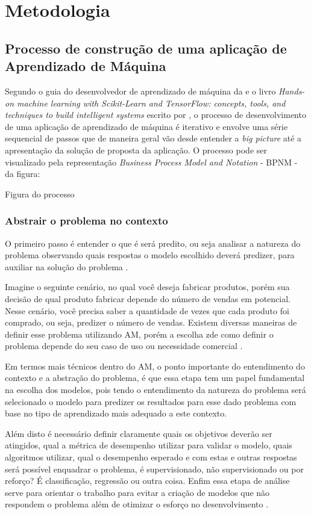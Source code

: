 \chapter{Metodologia}
\section{Processo de construção de uma aplicação de Aprendizado de Máquina}

Segundo o guia do desenvolvedor de aprendizado de máquina da \cite{Amazon} e o livro \textit{Hands-on machine learning with Scikit-Learn and TensorFlow: concepts, tools, and techniques to build intelligent systems} escrito por \cite{geron2017hands}, o processo de desenvolvimento de uma aplicação de aprendizado de máquina é iterativo e envolve uma série sequencial de passos que de maneira geral vão desde entender a \textit{big picture} até a apresentação da solução de proposta da aplicação. O processo pode ser visualizado pela representação \textit{Business Process Model and Notation} - BPNM - da figura:

Figura do processo 

\subsection{Abstrair o problema no contexto}
O primeiro passo é entender o que é será predito, ou seja analisar a natureza do problema observando quais respostas o modelo escolhido deverá predizer, para auxiliar na solução do problema \cite{geron2017hands}.

Imagine o seguinte cenário, no qual você deseja fabricar produtos, porém sua decisão de qual produto fabricar depende do número de vendas em potencial. Nesse cenário, você precisa saber a quantidade de vezes que cada produto foi comprado, ou seja, predizer o número de vendas. Existem diversas maneiras de definir esse problema utilizando AM, porém a escolha  zde como definir o problema depende do seu caso de uso ou necessidade comercial \cite{Amazon}.

Em termos mais técnicos dentro do AM, o ponto importante do entendimento do contexto e a abstração do problema, é que essa etapa tem um papel fundamental na escolha dos modelos, pois tendo o entendimento da natureza do problema será selecionado o modelo para predizer os resultados para esse dado problema com base no tipo de aprendizado mais adequado a este contexto.

Além disto é necessário definir claramente quais os objetivos deverão ser atingidos, qual a métrica de desempenho utilizar para validar o modelo, quais algoritmos utilizar, qual o desempenho esperado e com estas e outras respostas será possível enquadrar o problema, é supervisionado, não supervisionado ou por reforço? É classificação, regressão ou outra coisa\cite{geron2017hands}. Enfim essa etapa de análise serve para orientar o trabalho para evitar a criação de modelos que não respondem o problema além de otimizar o esforço no desenvolvimento \cite{Amazon}.

